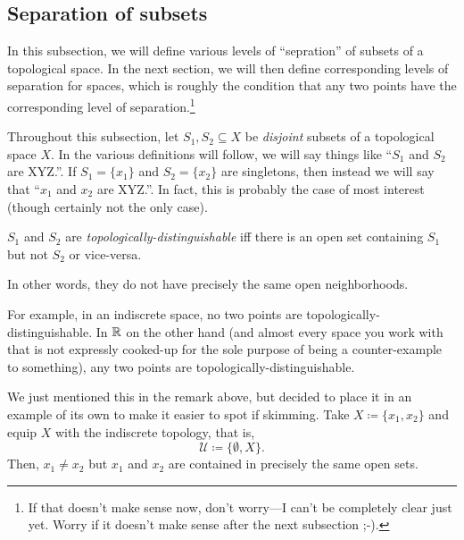 \subsection{Separation of subsets}

In this subsection, we will define various levels of ``sepration'' of subsets of a topological space.  In the next section, we will then define corresponding levels of separation for spaces, which is roughly the condition that any two points have the corresponding level of separation.\footnote{If that doesn't make sense now, don't worry---I can't be completely clear just yet.  Worry if it doesn't make sense after the next subsection ;-).}

Throughout this subsection, let $S_1,S_2\subseteq X$ be \emph{disjoint} subsets of a topological space $X$.  In the various definitions will follow, we will say things like ``$S_1$ and $S_2$ are XYZ.''.  If $S_1=\{ x_1\}$ and $S_2=\{ x_2\}$ are singletons, then instead we will say that ``$x_1$ and $x_2$ are XYZ.''.  In fact, this is probably the case of most interest (though certainly not the only case).
\begin{dfn}\label{TopologicallyDistinguishable}
$S_1$ and $S_2$ are \emph{topologically-distinguish\-able} iff there is an open set containing $S_1$ but not $S_2$ or vice-versa.
\begin{rmk}
In other words, they do not have precisely the same open neighborhoods.
\end{rmk}
\begin{rmk}
For example, in an indiscrete space, no two points are topologically-distinguishable.  In $\mathbb{R}$ on the other hand (and almost every space you work with that is not expressly cooked-up for the sole purpose of being a counter-example to something), any two points are topologically-distinguishable.
\end{rmk}
\end{dfn}
\begin{exm}\label{exm4.5.2}
We just mentioned this in the remark above, but decided to place it in an example of its own to make it easier to spot if skimming.  Take $X\coloneqq \{ x_1,x_2\}$ and equip $X$ with the indiscrete topology, that is,
\begin{equation}
\mathcal{U}\coloneqq \{ \emptyset ,X\} .
\end{equation}
Then, $x_1\neq x_2$ but $x_1$ and $x_2$ are contained in precisely the same open sets.
\end{exm}
